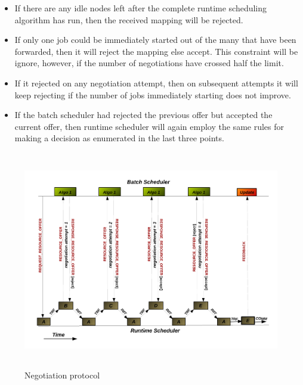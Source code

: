 \begin{itemize}
\item If there are any idle nodes left after the complete runtime scheduling algorithm has run, then the received mapping will be rejected.
\item If only one job could be immediately started out of the many that have been forwarded, then it will reject the mapping else accept. This
constraint will be ignore, however, if the number of negotiations have crossed half the limit.
\item If it rejected on any negotiation attempt, then on subsequent attempts it will keep rejecting if the number of jobs immediately starting does not improve.
\item If the batch scheduler had rejected the previous offer but accepted the current offer, then runtime scheduler will again employ the same rules for making a decision as enumerated in the last three points.
\end{itemize}
\begin{figure}[!t]
\hspace*{-0.5in}
\includegraphics[width=1.2\textwidth, height=95mm]{./figures/negotiation.pdf}
\caption{Negotiation protocol}
\label{fig:2}
\end{figure}
